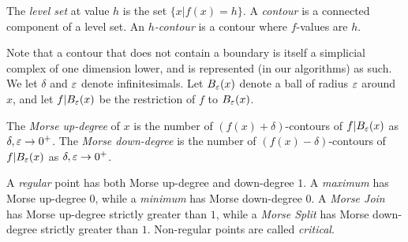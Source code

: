 \begin{definition} \label{def:level} The \emph{level set} at value $h$ is the set $\{x| f(x) = h\}$.
A \emph{contour} is a connected component of a level set. An \emph{$h$-contour} is a contour where $f$-values are $h$.
\end{definition}

Note that a contour that does not contain a boundary is itself a simplicial complex of one dimension lower, and is represented (in our algorithms) as such.
We let $\delta$ and $\varepsilon$ denote infinitesimals. Let $B_\varepsilon(x)$ denote a ball of radius $\varepsilon$ around $x$, and let 
$f|B_\varepsilon(x)$ be the restriction of $f$ to $B_\varepsilon(x)$.


\begin{definition} \label{def:deg} The \emph{Morse up-degree} of $x$ is the number of $(f(x) + \delta)$-contours of $f|B_\varepsilon(x)$
as $\delta, \varepsilon \rightarrow 0^+$. The \emph{Morse down-degree} is the number of $(f(x) - \delta)$-contours of $f|B_\varepsilon(x)$
as $\delta, \varepsilon \rightarrow 0^+$.

A \emph{regular} point has both Morse up-degree and down-degree $1$. A \emph{maximum} has Morse up-degree $0$, while
a \emph{minimum} has Morse down-degree $0$. A \emph{Morse Join} has Morse up-degree strictly greater than $1$,
while a \emph{Morse Split} has Morse down-degree strictly greater than $1$. Non-regular points are called \emph{critical}.
\end{definition}

% 
% 

